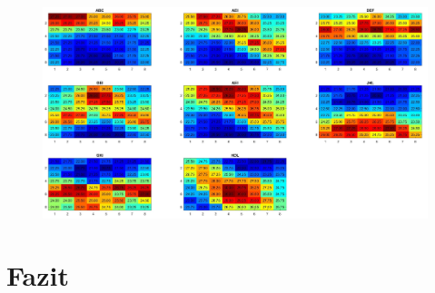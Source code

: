 \begin{figure}
	\centering
	\includegraphics[width=1.0\linewidth]{fig/p3_3x3_allpositons}
	\caption{}
	\label{fig:p33x3allpositons}
\end{figure}





\section{Fazit}